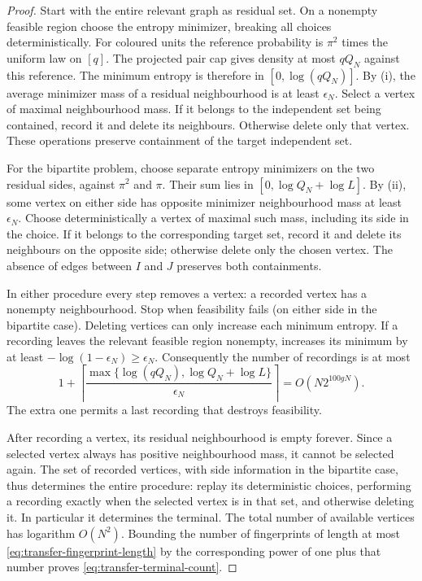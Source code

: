 \begin{proof}
Start with the entire relevant graph as residual set.  On a
nonempty feasible region choose the entropy minimizer, breaking
all choices deterministically.  For coloured units the reference
probability is \(\pi^2\) times the uniform law on \([q]\).
The projected pair cap gives density at most \(qQ_N\) against
this reference.  The minimum entropy is therefore in
\([0,\log(qQ_N)]\).
By (i), the average minimizer mass
of a residual neighbourhood is at least \(\epsilon_N\).
Select a vertex of maximal neighbourhood mass.  If it belongs
to the independent set being contained, record it and delete its
neighbours.  Otherwise delete only that vertex.  These operations
preserve containment of the target independent set.

For the bipartite problem, choose separate entropy minimizers on
the two residual sides, against \(\pi^2\) and \(\pi\).
Their sum lies in \([0,\log Q_N+\log L]\).
By (ii), some vertex on either side
has opposite minimizer neighbourhood mass at least
\(\epsilon_N\).  Choose deterministically a vertex of maximal
such mass, including its side in the choice.  If it belongs to
the corresponding target set, record it and delete its neighbours
on the opposite side; otherwise delete only the chosen vertex.
The absence of edges between \(I\) and \(J\) preserves both
containments.

In either procedure every step removes a vertex: a recorded
vertex has a nonempty neighbourhood.  Stop when feasibility
fails (on either side in the bipartite case).  Deleting vertices
can only increase each minimum entropy.  If a recording leaves
the relevant feasible region nonempty,  increases
its minimum by at least
\(-\log(1-\epsilon_N)\ge\epsilon_N\).
Consequently the number of recordings is at most
\begin{equation}\label{eq:transfer-fingerprint-length}
 1+\left\lceil
 \frac{\max\{\log(qQ_N),\log Q_N+\log L\}}
      {\epsilon_N}\right\rceil
 =O(N2^{100gN}).
\end{equation}
The extra one permits a last recording that destroys feasibility.

After recording a vertex, its residual neighbourhood is empty
forever.  Since a selected vertex always has positive neighbourhood
mass, it cannot be selected again.  The set of recorded vertices,
with side information in the bipartite case, thus determines the
entire procedure: replay its deterministic choices, performing a
recording exactly when the selected vertex is in that set, and
otherwise deleting it.  In particular it determines the terminal.
The total number of available vertices has logarithm \(O(N^2)\).
Bounding the number of fingerprints of length at most
\eqref{eq:transfer-fingerprint-length} by the corresponding power
of one plus that number proves \eqref{eq:transfer-terminal-count}.
\end{proof}

